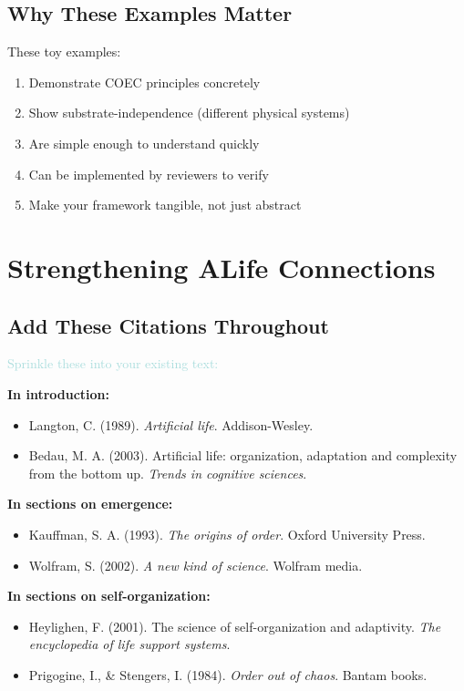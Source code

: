 \documentclass[11pt]{article}
\begin{document}
\subsection{Why These Examples Matter}

These toy examples:
\begin{enumerate}
    \item Demonstrate COEC principles concretely
    \item Show substrate-independence (different physical systems)
    \item Are simple enough to understand quickly
    \item Can be implemented by reviewers to verify
    \item Make your framework tangible, not just abstract
\end{enumerate}

\section{Strengthening ALife Connections} \label{sec:connections}

\subsection{Add These Citations Throughout}

\textcolor{add}{Sprinkle these into your existing text:}

\textbf{In introduction:}
\begin{itemize}
    \item Langton, C. (1989). \textit{Artificial life}. Addison-Wesley.
    \item Bedau, M. A. (2003). Artificial life: organization, adaptation and complexity from the bottom up. \textit{Trends in cognitive sciences}.
\end{itemize}

\textbf{In sections on emergence:}
\begin{itemize}
    \item Kauffman, S. A. (1993). \textit{The origins of order}. Oxford University Press.
    \item Wolfram, S. (2002). \textit{A new kind of science}. Wolfram media.
\end{itemize}

\textbf{In sections on self-organization:}
\begin{itemize}
    \item Heylighen, F. (2001). The science of self-organization and adaptivity. \textit{The encyclopedia of life support systems}.
    \item Prigogine, I., \& Stengers, I. (1984). \textit{Order out of chaos}. Bantam books.
\end{itemize}
\end{document}
